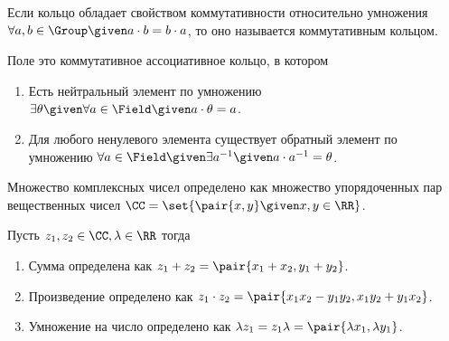 \begin{definition}
  Если кольцо обладает свойством коммутативности относительно умножения
  \(\forall a, b \in \Group \given a \cdot b = b \cdot a\), то оно называется
  коммутативным кольцом.
\end{definition}

\begin{definition}
  Поле это коммутативное ассоциативное кольцо, в котором
  
  \begin{enumerate}
  \item
    Есть нейтральный элемент по умножению \(\exists \theta \given \forall a \in
    \Field \given a \cdot \theta = a\).
    
  \item
    Для любого ненулевого элемента существует обратный элемент по умножению
    \(\forall a \in \Field \given \exists a^{-1} \given a \cdot a^{-1} =
    \theta\).
  \end{enumerate}
\end{definition}

\begin{definition}
  Множество комплексных чисел определено как множество упорядоченных пар
  вещественных чисел \(\CC = \set{ \pair{x, y} \given x, y \in \RR }\).
\end{definition}

Пусть \(z_1, z_2 \in \CC, \lambda \in \RR\) тогда

\begin{enumerate}
\item
  Сумма определена как \(z_1 + z_2 = \pair{x_1 + x_2, y_1 + y_2}\).
  
\item
  Произведение определено как \(z_1 \cdot z_2 = \pair{x_1 x_2 - y_1 y_2, x_1 y_2
  + y_1 x_2}\).
  
\item
  Умножение на число определено как \(\lambda z_1 = z_1 \lambda = \pair{\lambda
  x_1, \lambda y_1}\).
\end{enumerate}

